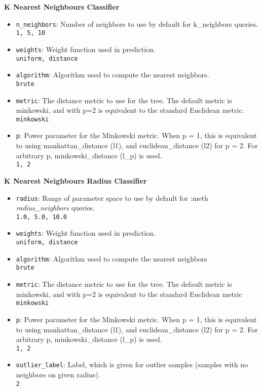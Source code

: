 \noindent \textbf{K Nearest Neighbours Classifier}
\begin{itemize}
  \item \texttt{n\_neighbors}: Number of neighbors to use by default for k\_neighbors queries.\\
  \texttt{1, 5, 10}
  \item \texttt{weights}: Weight function used in prediction.\\
  \texttt{uniform, distance}
  \item \texttt{algorithm}: Algorithm used to compute the nearest neighbors.\\
  \texttt{brute}
  \item \texttt{metric}: The distance metric to use for the tree. The default metric is minkowski, and with p=2 is equivalent to the standard Euclidean metric.\\
  \texttt{minkowski}
  \item \texttt{p}: Power parameter for the Minkowski metric. When p = 1, this is equivalent to using manhattan\_distance (l1), and euclidean\_distance (l2) for p = 2. For arbitrary p, minkowski\_distance (l\_p) is used.\\
  \texttt{1, 2}
\end{itemize}

\noindent \textbf{K Nearest Neighbours Radius Classifier}
\begin{itemize}
  \item \texttt{radius}: Range of parameter space to use by default for :meth \emph{radius\_neighbors} queries.\\
  \texttt{1.0, 5.0, 10.0}
  \item \texttt{weights}: Weight function used in prediction.\\
  \texttt{uniform, distance}
  \item \texttt{algorithm}: Algorithm used to compute the nearest neighbors\\
  \texttt{brute}
  \item \texttt{metric}: The distance metric to use for the tree. The default metric is minkowski, and with p=2 is equivalent to the standard Euclidean metric\\
  \texttt{minkowski}
  \item \texttt{p}: Power parameter for the Minkowski metric. When p = 1, this is equivalent to using manhattan\_distance (l1), and euclidean\_distance (l2) for p = 2. For arbitrary p, minkowski\_distance (l\_p) is used.\\
  \texttt{1, 2}
  \item \texttt{outlier\_label}: Label, which is given for outlier samples (samples with no neighbors on given radius).\\
  \texttt{2}
\end{itemize}
